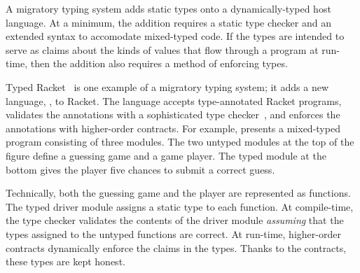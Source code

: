 A migratory typing system adds static types onto a
dynamically-typed host language.
At a minimum, the addition requires a static type checker and an extended
syntax to accomodate mixed-typed code.
If the types are intended to serve as claims about the kinds of values that
flow through a program at run-time, then the addition also requires a method
of enforcing types.

Typed Racket~\cite{tf-popl-2008} is one example of a migratory typing system; it adds
a new language, , to Racket.
The language accepts type-annotated Racket programs,
validates the annotations with a sophisticated type checker~\cite{tf-icfp-2010},
and enforces the annotations with higher-order contracts.
For example,  presents a mixed-typed
program consisting of three modules.
The two untyped modules at the top of the figure define a guessing game
and a game player.
The typed module at the bottom gives the player five chances to submit a
correct guess.

Technically, both the guessing game and the player are represented as functions.
The typed driver module assigns a static type to each function.
At compile-time, the type checker validates the contents of the driver module
\emph{assuming}\/ that the types assigned to the untyped functions are correct.
At run-time, higher-order contracts dynamically enforce the claims in the types.
Thanks to the contracts, these types are kept honest.


